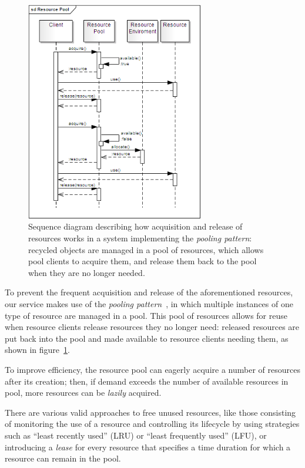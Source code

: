 \documentclass[11pt]{article}
\begin{document}

\begin{figure}[!ht]
\begin{center}
\includegraphics[width=7.75cm]{resource_pool}
\end{center}
\caption{Sequence diagram describing how acquisition and release of resources works in a 
   system implementing the \emph{pooling pattern}: recycled objects are managed in a pool 
   of resources, which allows pool clients to acquire them, and release them back to the 
   pool when they are no longer needed.}
\label{fig:rp}
\end{figure}

To prevent the frequent acquisition and release of the aforementioned resources, our service 
makes use of the \emph{pooling pattern}~\citep{kircher2001}, in which multiple instances of one 
type of resource are managed in a pool. This pool of resources allows for reuse when resource clients 
release resources they no longer need: released resources are put back into the pool and made 
available to resource clients needing them, as shown in figure~\ref{fig:rp}.

To improve efficiency, the resource pool can eagerly acquire a number of resources after its 
creation; then, if demand exceeds the number of available resources in pool, more resources can
be \emph{lazily} acquired.

There are various valid approaches to free unused resources, like those consisting of monitoring 
the use of a resource and controlling its lifecycle by using  strategies such as ``least recently 
used'' (LRU) or ``least frequently used'' (LFU), or introducing a \emph{lease} for every resource 
that specifies a time duration for which a resource can remain in the pool.
\end{document}
